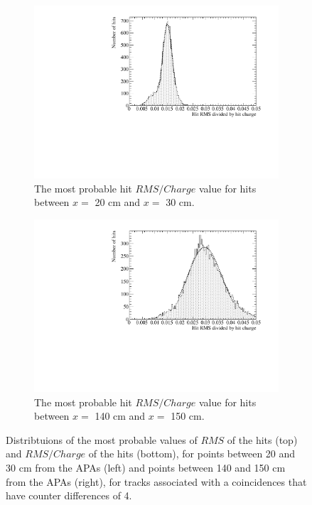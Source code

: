 \begin{figure}[h!]
\begin{subfigure}{0.45\textwidth}
    \includegraphics[width=\textwidth]{DataCan_2}
    \caption{The most probable hit $RMS/Charge$ value for hits between $x =$ 20 cm and $x =$ 30 cm.}
  \end{subfigure}
  \hspace{0.08\textwidth}
  \begin{subfigure}{0.45\textwidth}
    \centering
    \includegraphics[width=\textwidth]{DataCan_3}
    \caption{The most probable hit $RMS/Charge$ value for hits between $x =$ 140 cm and $x =$ 150 cm.}
  \end{subfigure}
  \caption[The most probable values of the $RMS$ and $RMS/Charge$ distributions for tracks with a counter difference of 4 in the 35 ton data]
          {Distribtuions of the most probable values of $RMS$ of the hits (top) and $RMS/Charge$ of the hits (bottom), for points between 20 and 30 cm from the APAs (left) and points between 140 and 150 cm from the APAs (right), for tracks associated with a coincidences that have counter differences of 4. }
          \label{fig:DiffDataHitFit}
\end{figure}

